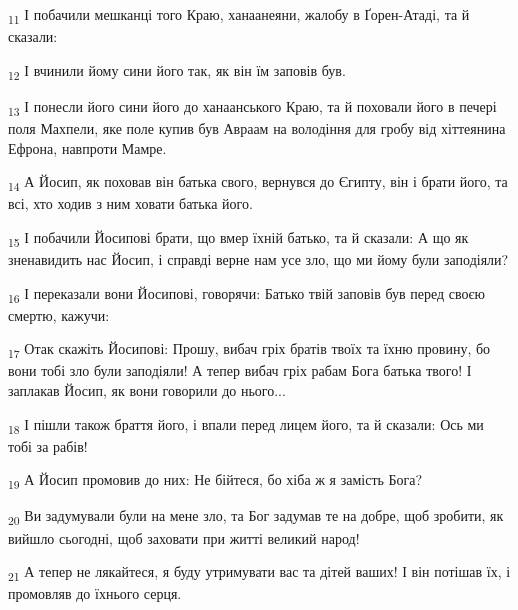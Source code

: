 \begin{tcolorbox}
\textsubscript{11} І побачили мешканці того Краю, ханаанеяни, жалобу в Ґорен-Атаді, та й сказали:
\end{tcolorbox}
\begin{tcolorbox}
\textsubscript{12} І вчинили йому сини його так, як він їм заповів був.
\end{tcolorbox}
\begin{tcolorbox}
\textsubscript{13} І понесли його сини його до ханаанського Краю, та й поховали його в печері поля Махпели, яке поле купив був Авраам на володіння для гробу від хіттеянина Ефрона, навпроти Мамре.
\end{tcolorbox}
\begin{tcolorbox}
\textsubscript{14} А Йосип, як поховав він батька свого, вернувся до Єгипту, він і брати його, та всі, хто ходив з ним ховати батька його.
\end{tcolorbox}
\begin{tcolorbox}
\textsubscript{15} І побачили Йосипові брати, що вмер їхній батько, та й сказали: А що як зненавидить нас Йосип, і справді верне нам усе зло, що ми йому були заподіяли?
\end{tcolorbox}
\begin{tcolorbox}
\textsubscript{16} І переказали вони Йосипові, говорячи: Батько твій заповів був перед своєю смертю, кажучи:
\end{tcolorbox}
\begin{tcolorbox}
\textsubscript{17} Отак скажіть Йосипові: Прошу, вибач гріх братів твоїх та їхню провину, бо вони тобі зло були заподіяли! А тепер вибач гріх рабам Бога батька твого! І заплакав Йосип, як вони говорили до нього...
\end{tcolorbox}
\begin{tcolorbox}
\textsubscript{18} І пішли також браття його, і впали перед лицем його, та й сказали: Ось ми тобі за рабів!
\end{tcolorbox}
\begin{tcolorbox}
\textsubscript{19} А Йосип промовив до них: Не бійтеся, бо хіба ж я замість Бога?
\end{tcolorbox}
\begin{tcolorbox}
\textsubscript{20} Ви задумували були на мене зло, та Бог задумав те на добре, щоб зробити, як вийшло сьогодні, щоб заховати при житті великий народ!
\end{tcolorbox}
\begin{tcolorbox}
\textsubscript{21} А тепер не лякайтеся, я буду утримувати вас та дітей ваших! І він потішав їх, і промовляв до їхнього серця.
\end{tcolorbox}
